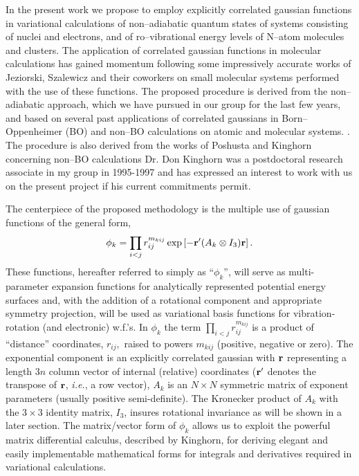 In the present work we propose to employ explicitly correlated
gaussian functions in variational calculations of 
non--adiabatic quantum states of systems 
consisting of nuclei and electrons, and of
ro--vibrational
energy levels of N--atom molecules and clusters. 
The application of correlated gaussian functions in
molecular calculations has gained momentum
following some impressively accurate 
works of Jeziorski, Szalewicz and
their coworkers on small molecular systems performed
with the use of these functions.
\cite{sz1}
The proposed procedure is derived from
the non--adiabatic approach, which we have pursued in our group
for the last few years, and based on several past applications
of correlated gaussians in Born--Oppenheimer (BO) 
and non--BO calculations on atomic
and molecular systems.
\cite{A2,A3,A6,A8,%
A14,%
A16,%
A20,A21,%
A27,%
A37,%
A38,A382,A383,%
kozlowski91,kozlowski92a,kozlowski92b,kozlowski92c}.
The procedure is also derived from the works 
of Poshusta and Kinghorn
concerning non--BO calculations
\cite{Poshusta83,Kinghorn93,Kinghorn95b}
Dr. Don Kinghorn was a postdoctoral research associate 
in my group in 1995-1997 and has
expressed an interest to work with us on the present project
if his current commitments permit.

The centerpiece of the 
proposed methodology is the multiple use of 
gaussian functions of the
general form, 
\begin{equation}
\phi _k=\prod_{i<j}r_{ij}^{m_{kij}}\exp \left[ -{\bf r}^{\prime
}(A_k\otimes I_3){\bf r}\right] .  
\label{basisfcn}
\end{equation}
These functions, hereafter referred to simply as ``$\phi _k$'', will serve
as multi-parameter expansion functions for analytically represented
potential energy surfaces and, with the addition of a rotational component
and appropriate symmetry projection, will be used as variational basis
functions for vibration-rotation (and electronic) w.f.'s. In $\phi
_k $ the term $\prod_{i<j}r_{ij}^{m_{kij}}$ is a product of ``distance''
coordinates, $r_{ij},$ raised to powers $m_{kij}$ (positive, negative
\cite{kpc}
or zero).
 The exponential component is an explicitly correlated gaussian with $%
{\bf r}$ representing a length $3n$ column vector of internal (relative)
coordinates (${\bf r}^{\prime }$ denotes the transpose of ${\bf r}$,
{\it i.e.}, a row vector), $A_k$ is an 
$N\times N$ symmetric matrix of exponent
parameters (usually positive semi-definite). The Kronecker product of $A_k$
with the $3\times 3$ identity matrix, $I_3$, insures rotational invariance
as will be shown in a later section. The matrix/vector form of $\phi _k$
allows us to exploit the powerful matrix differential calculus, described by
Kinghorn\cite{Kinghorn95a}, for deriving elegant and easily implementable
mathematical forms for integrals and derivatives required in variational
calculations.

